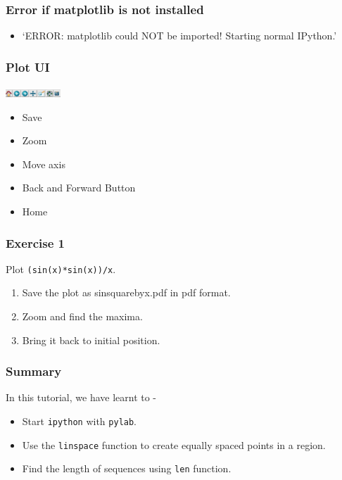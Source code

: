 \documentclass[17pt,compress]{beamer}
\begin{document}
\begin{frame}
\frametitle{Error if matplotlib is not installed}
\label{sec-3}
\begin{itemize}
\item `ERROR: matplotlib could NOT be imported! Starting normal IPython.'\\
\label{sec-3_1}%
\end{itemize} %
\end{frame}
\begin{frame}
\frametitle{Plot UI}
\label{sec-4}
\includegraphics[height=0.12in, interpolate=true]{buttons.png}
\begin{itemize}
\item Save
\item Zoom
\item Move axis
\item Back and Forward Button
\item Home
\end{itemize}
\end{frame}
\begin{frame}
\frametitle{Exercise 1}
\label{sec-5}
Plot \texttt{(sin(x)*sin(x))/x}.\pause
\begin{enumerate}
\item Save the plot as sinsquarebyx.pdf in pdf format.\pause
\item Zoom and find the maxima.\pause
\item Bring it back to initial position.
\end{enumerate}
\end{frame}
\begin{frame}
\frametitle{Summary}
\label{sec-6.1}
In this tutorial, we have learnt to -\pause
\begin{itemize}
\item Start \texttt{ipython} with \texttt{pylab}.
\item Use the \texttt{linspace} function to create equally spaced points in a region.
\item Find the length of sequences using \texttt{len} function.
\end{itemize}
\end{frame}
\end{document}

